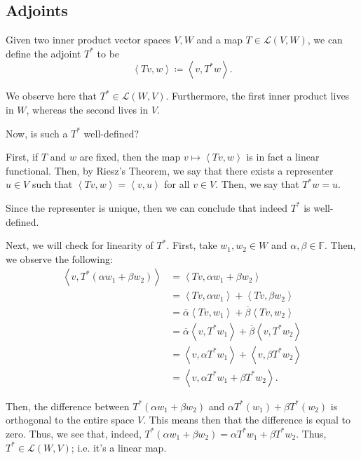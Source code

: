 \documentclass[openany]{book}
\newcommand{\innerproduct}[2]{\left\langle{#1}, {#2}\right\rangle}
\begin{document}
\subsection{Adjoints}
\begin{defn}[Adjoint]
	Given two inner product vector spaces $V, W$ and a map $T \in \mathcal{L}(V,W)$, we can define the adjoint $T^{*}$ to be
	\begin{equation*}
		\innerproduct{Tv}{w} \coloneq \innerproduct{v}{T^{*}w}.
	\end{equation*}

	We observe here that $T^{*} \in \mathcal{L}(W,V)$. Furthermore, the first inner product lives in $W$, whereas the second lives in $V$.
\end{defn}
	Now, is such a $T^{*}$ well-defined?
	
	First, if $T$ and $w$ are fixed, then the map $v \mapsto \innerproduct{Tv}{w}$ is in fact a linear functional. Then, by Riesz's Theorem, we say that there exists a representer $u \in V$ such that $\innerproduct{Tv}{w} = \innerproduct{v}{u}$ for all $v \in V$. Then, we say that $T^{*}w = u$.
	
	Since the representer is unique, then we can conclude that indeed $T^{*}$ is well-defined.
	
	Next, we will check for linearity of $T^{*}$. First, take $w_{1}, w_{2} \in W$ and $\alpha, \beta \in \mathbb{F}$. Then, we observe the following:
	\begin{align*}
		\innerproduct{v}{T^{*}(\alpha w_{1} + \beta w_{2})} &= \innerproduct{Tv}{\alpha w_{1} + \beta w_{2}} \\
		&= \innerproduct{Tv}{\alpha w_{1}} + \innerproduct{Tv}{\beta w_{2}} \\
		&= \overline{\alpha}\innerproduct{Tv}{w_{1}} + \overline{\beta}\innerproduct{Tv}{w_{2}} \\
		&= \overline{\alpha}\innerproduct{v}{T^{*}w_{1}} + \overline{\beta}\innerproduct{v}{T^{*}w_{2}} \\
		&= \innerproduct{v}{\alpha T^{*}w_{1}} + \innerproduct{v}{\beta T^{*}w_{2}} \\
		&= \innerproduct{v}{\alpha T^{*}w_{1} + \beta T^{*}w_{2}}.
	\end{align*}
	
	Then, the difference between $T^{*}(\alpha w_{1} + \beta w_{2})$ and $\alpha T^{*}(w_{1}) + \beta T^{*}(w_{2})$ is orthogonal to the entire space $V$. This means then that the difference is equal to zero. Thus, we see that, indeed, $T^{*}(\alpha w_{1} + \beta w_{2}) = \alpha T^{*}w_{1} + \beta T^{*}w_{2}$. Thus, $T^{*} \in \mathcal{L}(W,V)$; i.e. it's a linear map.
	
\end{document}
